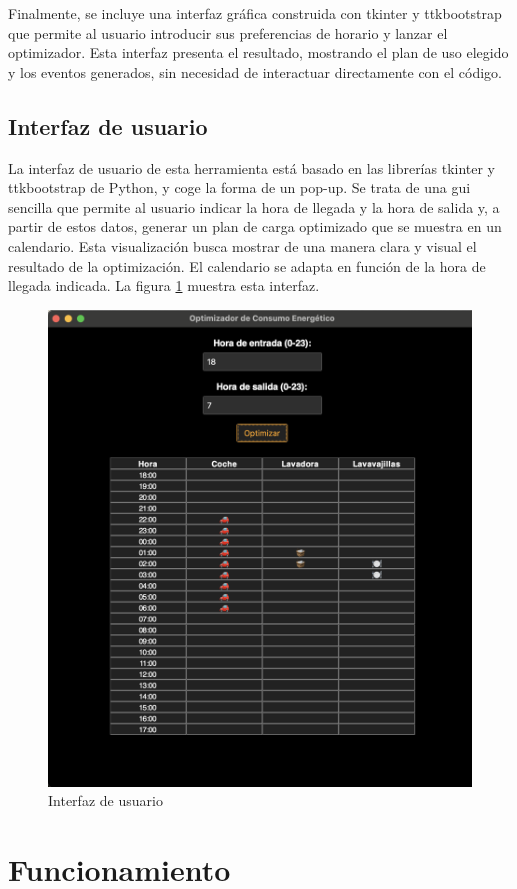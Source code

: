 \documentclass[11pt,a4paper]{book}
\begin{document}
Finalmente, se incluye una interfaz gráfica construida con tkinter y ttkbootstrap que permite al usuario introducir sus preferencias de horario y lanzar el optimizador. Esta interfaz presenta el resultado, mostrando el plan de uso elegido y los eventos generados, sin necesidad de interactuar directamente con el código.

\subsection{Interfaz de usuario}
La interfaz de usuario de esta herramienta está basado en las librerías tkinter y ttkbootstrap de Python, y coge la forma de un pop-up. Se trata de una \gls{gui} sencilla que permite al usuario indicar la hora de llegada y la hora de salida y, a partir de estos datos, generar un plan de carga optimizado que se muestra en un calendario. Esta visualización busca mostrar de una manera clara y visual el resultado de la optimización. El calendario se adapta en función de la hora de llegada indicada. La figura \ref{fig:gui} muestra esta interfaz.

\begin{figure}[H]
    \centering
    \includegraphics[width=0.75\linewidth]{fig/GUI.png}
    \caption{Interfaz de usuario}
    \label{fig:gui}
\end{figure}
\section{Funcionamiento}
\end{document}

